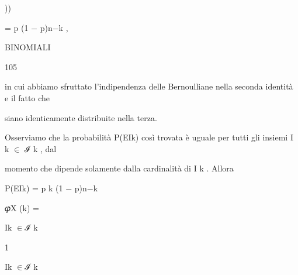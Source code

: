\documentclass[a4paper,portrait,12pt]{article}
\begin{document}
))





\begin{flushleft}
= p (1 $-$ p)n$-$k ,
\end{flushleft}





\begin{flushleft}
 BINOMIALI
\end{flushleft}





105





\begin{flushleft}
in cui abbiamo sfruttato l'indipendenza delle Bernoulliane nella seconda identit\`{a} e il fatto che
\end{flushleft}


\begin{flushleft}
siano identicamente distribuite nella terza.
\end{flushleft}


\begin{flushleft}
Osserviamo che la probabilit\`{a} P(EIk) così trovata \`{e} uguale per tutti gli insiemi I k $\in$ ℐ k , dal
\end{flushleft}


\begin{flushleft}
momento che dipende solamente dalla cardinalit\`{a} di I k . Allora
\end{flushleft}


\begin{flushleft}
P(EIk) = p k (1 $-$ p)n$-$k
\end{flushleft}





\begin{flushleft}
𝜑X (k) =
\end{flushleft}


\begin{flushleft}
Ik $\in$ℐ k
\end{flushleft}





1


\begin{flushleft}
Ik $\in$ℐ k
\end{flushleft}
\end{document}
